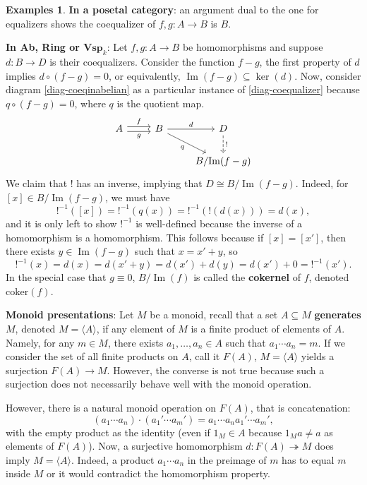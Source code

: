 \documentclass{article}
\theoremstyle{definition}
\newtheorem{exmps}[thm]{Examples}
\theoremstyle{remark}
\DeclareMathOperator{\im}{Im}
\begin{document}
\begin{exmps}
    \textbf{In a posetal category}: an argument dual to the one for equalizers shows the coequalizer of $f,g:A \rightarrow B$ is $B$.

    \textbf{In Ab, Ring or $\textbf{Vsp}_k$}: Let $f,g: A \rightarrow B$ be homomorphisms and suppose $d:B \rightarrow D$ is their coequalizers. Consider the function $f-g$, the first property of $d$ implies $d \circ (f-g) = 0$, or equivalently, $\im(f-g) \subseteq \ker(d)$. Now, consider diagram \eqref{diag-coeqinabelian} as a particular instance of \eqref{diag-coequalizer} because $q\circ (f-g) = 0$, where $q$ is the quotient map.
    \begin{equation}\label{diag-coeqinabelian}
        \begin{tikzcd}
            A \arrow[r, "f", shift left] \arrow[r, "g"', shift right] & B \arrow[r, "d"] \arrow[rd, "q"'] & D \arrow[d, "!", dashed] \\& & B/{\im(f-g)}
        \end{tikzcd}
    \end{equation}
    We claim that $!$ has an inverse, implying that $D \cong B/\im(f-g)$. Indeed, for $[x] \in B/\im(f-g)$, we must have 
    \[!^{-1}([x]) = !^{-1}(q(x)) = !^{-1}(!(d(x)))= d(x),\]
    and it is only left to show $!^{-1}$ is well-defined because the inverse of a homomorphism is a homomorphism. This follows because if $[x] = [x']$, then there exists $y \in \im(f-g)$ such that $x = x' + y$, so \[!^{-1}(x) = d(x) = d(x'+y) = d(x') +d(y) = d(x') + 0 = !^{-1}(x').\]
    In the special case that $g \equiv 0$, $B/\im(f)$ is called the \textbf{cokernel} of $f$, denoted $\text{coker}(f)$.

    \textbf{Monoid presentations}: Let $M$ be a monoid, recall that a set $A \subseteq M$ \textbf{generates} $M$, denoted $M = \langle A \rangle$, if any element of $M$ is a finite product of elements of $A$. Namely, for any $m \in M$, there exists $a_1,\dots, a_n \in A$ such that $a_1 \cdots a_n = m$. If we consider the set of all finite products on $A$, call it $F(A)$, $M = \langle A \rangle$ yields a surjection $F(A) \rightarrow M$. However, the converse is not true because such a surjection does not necessarily behave well with the monoid operation.

    However, there is a natural monoid operation on $F(A)$, that is concatenation: \[(a_1\cdots a_n) \cdot (a_1'\cdots a_m') = a_1\cdots a_na_1'\cdots a_m',\]
    with the empty product as the identity (even if $1_M \in A$ because $1_Ma \neq a$ as elements of $F(A)$). Now, a surjective homomorphism $d: F(A) \twoheadrightarrow M$ does imply $M = \langle A \rangle$. Indeed, a product $a_1\cdots a_n$ in the preimage of $m$ has to equal $m$ inside $M$ or it would contradict the homomorphism property.


\end{exmps}
\end{document}
